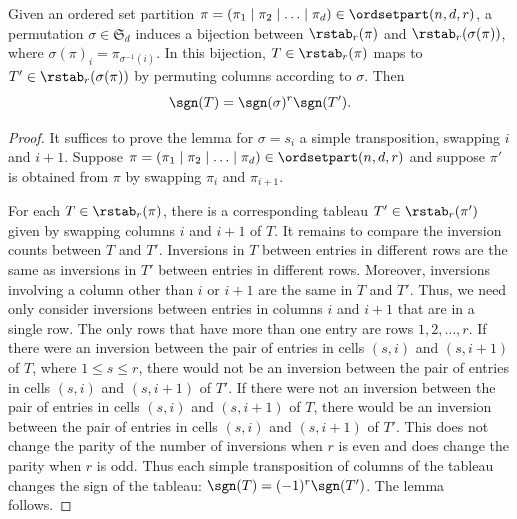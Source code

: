 \begin{lemma}\label{lem:colswap}
Given an ordered set partition $\pi=(\pi_1\mid \pi_2\mid \ldots\mid \pi_d)\in\ordsetpart(n,d,r)$, a permutation $\sigma\in \mathfrak{S}_d$ induces a bijection between $\rstab_r(\pi)$ and $\rstab_r(\sigma(\pi))$, where $\sigma(\pi)_i = \pi_{\sigma^{-1}(i)}$. In this bijection,
$T\in\rstab_r(\pi)$ maps to $T'\in\rstab_r(\sigma(\pi))$ by permuting columns according to $\sigma$. Then \[\sgn(T)=\sgn(\sigma)^r\sgn(T').\]
\end{lemma}
\begin{proof}
It suffices to prove the lemma for $\sigma = s_i$ a simple transposition, swapping $i$ and $i+1$.
Suppose $\pi=(\pi_1\mid \pi_2\mid \ldots\mid \pi_d)\in\ordsetpart(n,d,r)$ and suppose $\pi'$ is obtained from $\pi$ by swapping $\pi_i$ and $\pi_{i+1}$. 

For each $T\in\rstab_r(\pi)$, there is a corresponding tableau $T'\in\rstab_r(\pi')$ given by swapping columns $i$ and $i+1$ of $T$. It remains to compare the inversion counts between $T$ and $T'$. Inversions in $T$ between entries in different rows are the same as inversions in $T'$ between entries in different rows. 
Moreover, inversions involving a column other than $i$ or $i+1$ are the same in $T$ and $T'$.
Thus, we need only consider inversions between entries in columns $i$ and $i+1$ that are in a single row. The only rows that have more than one entry are rows $1,2,\ldots,r$. If there were an inversion between the pair of entries in cells $(s,i)$ and $(s,i+1)$ of $T$,  where $1\leq s \leq r$, there would not be an inversion between the pair of entries in cells $(s,i)$ and $(s,i+1)$ of $T'$. If there were not an inversion between the pair of entries in cells $(s,i)$ and $(s,i+1)$ of $T$, there would be an inversion between the pair of entries in cells $(s,i)$ and $(s,i+1)$ of $T'$. This does not change the parity of the number of inversions when $r$ is even and does change the parity when $r$ is odd. Thus each simple transposition of columns of the tableau changes the sign of the tableau: ${\sgn(T)}=(-1)^r{\sgn(T')}$. The lemma follows.
\end{proof}

